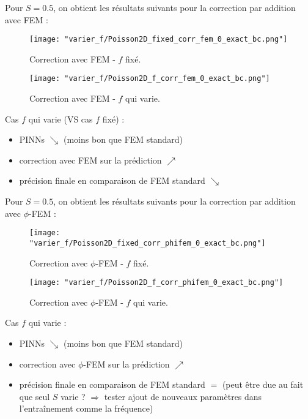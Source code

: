 \newpage

Pour $S=0.5$, on obtient les résultats suivants pour la correction par addition avec FEM :

\begin{minipage}{0.48\linewidth}
	\begin{figure}[H]
		\centering
		\texttt{[image: "varier\_f/Poisson2D\_fixed\_corr\_fem\_0\_exact\_bc.png"]}
		\caption{Correction avec FEM - $f$ fixé.}
		\label{Poisson2D_fixed_corr_fem_0_exact_bc}
	\end{figure}
\end{minipage}
\begin{minipage}{0.48\linewidth}
	\begin{figure}[H]
		\centering
		\texttt{[image: "varier\_f/Poisson2D\_f\_corr\_fem\_0\_exact\_bc.png"]}
		\caption{Correction avec FEM - $f$ qui varie.}
	\end{figure}
\end{minipage}

\begin{Obs}
	Cas $f$ qui varie (VS cas $f$ fixé) :
	\begin{itemize}
		\item PINNs $\searrow$ (moins bon que FEM standard)
		\item correction avec FEM sur la prédiction $\nearrow$ 
		\item précision finale en comparaison de FEM standard $\searrow$ 
	\end{itemize}
\end{Obs}

Pour $S=0.5$, on obtient les résultats suivants pour la correction par addition avec $\phi$-FEM :

\begin{minipage}{0.48\linewidth}
	\begin{figure}[H]
		\centering
		\texttt{[image: "varier\_f/Poisson2D\_fixed\_corr\_phifem\_0\_exact\_bc.png"]}
		\caption{Correction avec $\phi$-FEM - $f$ fixé.}
	\end{figure}
\end{minipage}
\begin{minipage}{0.48\linewidth}
	\begin{figure}[H]
		\centering
		\texttt{[image: "varier\_f/Poisson2D\_f\_corr\_phifem\_0\_exact\_bc.png"]}
		\caption{Correction avec $\phi$-FEM - $f$ qui varie.}
	\end{figure}
\end{minipage}

\begin{Obs}
	Cas $f$ qui varie :
	\begin{itemize}
		\item PINNs $\searrow$ (moins bon que FEM standard)
		\item correction avec $\phi$-FEM sur la prédiction $\nearrow$ 
		\item précision finale en comparaison de FEM standard $=$ (peut être due au fait que seul $S$ varie ? $\Rightarrow$ tester ajout de nouveaux paramètres dans l'entraînement comme la fréquence)
	\end{itemize}
\end{Obs}

